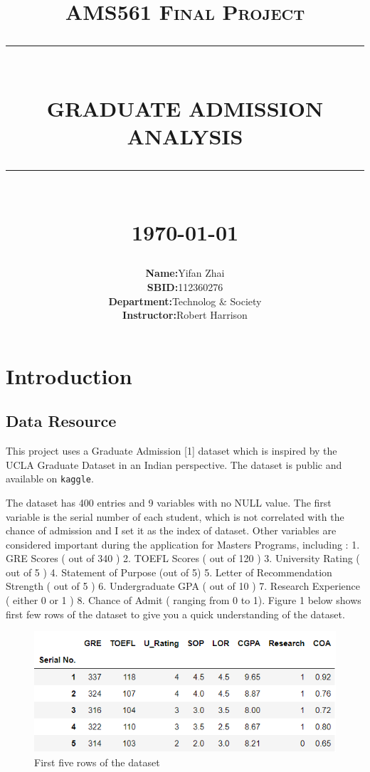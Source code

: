 \documentclass[12pt]{article}
\newcommand{\HRule}[1]{\rule{\linewidth}{#1}}
\begin{document}
\begin{sloppypar}
\title{ \LARGE \textsc{AMS561 Final Project}
		\\ [2.0cm]
		\HRule{0.5pt} \\
		\LARGE \textbf{\uppercase{Graduate Admission Analysis}}
		\HRule{2pt} \\ [0.5cm]
		\normalsize \today \vspace*{5\baselineskip}}

\date{}


\author{\begin{tabular}{rl}
  \textbf{Name:} &Yifan Zhai\\
  \textbf{SBID:}  &112360276\\
  \textbf{Department:} & Technolog \& Society\\
  \textbf{Instructor:} & Robert Harrison
\end{tabular}}

\maketitle
\thispagestyle{empty}
\newpage
\setcounter{page}{1}
\tableofcontents
\newpage


\section{Introduction}

\subsection{Data Resource}
This project uses a Graduate Admission [1] dataset which is inspired by the UCLA Graduate Dataset in an Indian perspective. The dataset is public and available on \texttt{kaggle}. 

The dataset has 400 entries and 9 variables with no NULL value. The first variable is the serial number of each student, which is not correlated with the chance of admission and I set it as the index of dataset. Other variables are  considered important during the application for Masters Programs, including : 1. GRE Scores ( out of 340 ) 2. TOEFL Scores ( out of 120 ) 3. University Rating ( out of 5 ) 4. Statement of Purpose (out of 5) 5. Letter of Recommendation Strength ( out of 5 ) 6. Undergraduate GPA ( out of 10 ) 7. Research Experience ( either 0 or 1 ) 8. Chance of Admit ( ranging from 0 to 1). Figure 1 below shows first few rows of the dataset to give you a quick understanding of the dataset.
\begin{figure}[H]
    \centering
    \includegraphics{head.png}
    \caption{First five rows of the dataset}
\end{figure}



\end{sloppypar}
\end{document}
